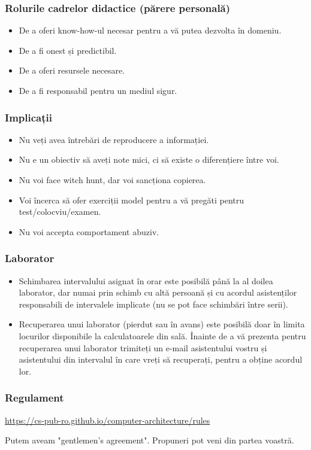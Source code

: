 \begin{frame}
    \frametitle{Rolurile cadrelor didactice (părere personală)}
\begin{itemize}
    \item De a oferi know-how-ul necesar pentru a vă putea dezvolta în domeniu.
    \item De a fi onest și predictibil.
    \item De a oferi resursele necesare.
    \item De a fi responsabil pentru un mediul sigur.
\end{itemize}

\end{frame}

\begin{frame}
    \frametitle{Implicații}
\begin{itemize}
    \item Nu veți avea întrebări de reproducere a informației.
    \item Nu e un obiectiv să aveți note mici, ci să existe o diferențiere între voi.
    \item Nu voi face witch hunt, dar voi sancționa copierea.
    \item Voi încerca să ofer exerciții model pentru a vă pregăti pentru test/colocviu/examen.
    \item Nu voi accepta comportament abuziv.
\end{itemize}

\end{frame}

\begin{frame}
    \frametitle{Laborator}
    
\begin{itemize}
    \item Schimbarea intervalului asignat în orar este posibilă până la al doilea laborator, dar numai prin schimb cu altă persoană și cu acordul asistenților responsabili de intervalele implicate (nu se pot face schimbări între serii).
    \item Recuperarea unui laborator (pierdut sau în avans) este posibilă doar în limita locurilor disponibile la calculatoarele din sală. Înainte de a vă prezenta pentru recuperarea unui laborator trimiteți un e-mail asistentului vostru și asistentului din intervalul în care vreți să recuperați, pentru a obține acordul lor.
\end{itemize}
\end{frame}


\begin{frame}
    \frametitle{Regulament}
    
    \href{https://cs-pub-ro.github.io/computer-architecture/rules}{https://cs-pub-ro.github.io/computer-architecture/rules}

    Putem aveam "gentlemen's agreement". Propuneri pot veni din partea voastră.
\end{frame}